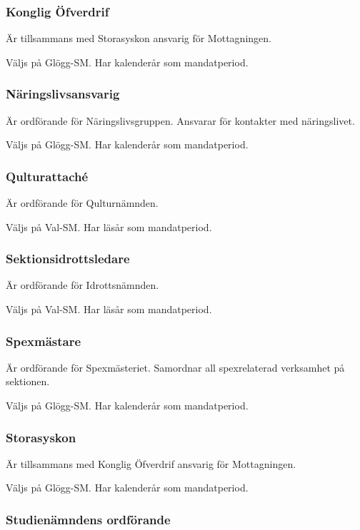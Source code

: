 \documentclass{dgovdoc}
\begin{document}
\subsubsection{Konglig Öfverdrif}

Är tillsammans med Storasyskon ansvarig för Mottagningen.

Väljs på Glögg-SM. Har kalenderår som mandatperiod.

\subsubsection{Näringslivsansvarig}

Är ordförande för Näringslivsgruppen. Ansvarar för kontakter med näringslivet.

Väljs på Glögg-SM. Har kalenderår som mandatperiod.

\subsubsection{Qulturattaché}

Är ordförande för Qulturnämnden.

Väljs på Val-SM. Har läsår som mandatperiod.

\subsubsection{Sektionsidrottsledare}

Är ordförande för Idrottsnämnden.

Väljs på Val-SM. Har läsår som mandatperiod.

\subsubsection{Spexmästare}

Är ordförande för Spexmästeriet. Samordnar all spexrelaterad verksamhet på
sektionen.

Väljs på Glögg-SM. Har kalenderår som mandatperiod.

\subsubsection{Storasyskon}

Är tillsammans med Konglig Öfverdrif ansvarig för Mottagningen.

Väljs på Glögg-SM. Har kalenderår som mandatperiod.

\subsubsection{Studienämndens ordförande}
\end{document}
